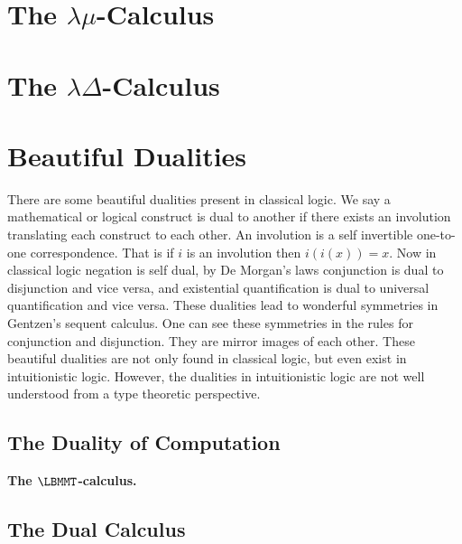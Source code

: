 \section{The $\lambda\mu$-Calculus}
\label{sec:the_lambda-mu-calculus}


\section{The $\lambda\Delta$-Calculus}
\label{sec:the_lambda-delta-calculus}


\section{Beautiful Dualities}
\label{sec:beautiful_dualities}
There are some beautiful dualities present in classical logic.  We say
a mathematical or logical construct is dual to another if there exists
an involution translating each construct to each other.  An involution
is a self invertible one-to-one correspondence.  That is if $i$ is an
involution then $i(i(x)) = x$.  Now in classical logic negation is
self dual, by De Morgan's laws conjunction is dual to disjunction and
vice versa, and existential quantification is dual to universal
quantification and vice versa.  These dualities lead to wonderful
symmetries in Gentzen's sequent calculus.  One can see these
symmetries in the rules for conjunction and disjunction.  They are
mirror images of each other.  These beautiful dualities are not
only found in classical logic, but even exist in intuitionistic logic.
However, the dualities in intuitionistic logic are not well understood
from a type theoretic perspective.

\subsection{The Duality of Computation}
\label{subsec:the_duality_of_computation}
\textbf{The $\LBMMT$-calculus.} 

\subsection{The Dual Calculus}
\label{subsec:the_dual_calculus}


